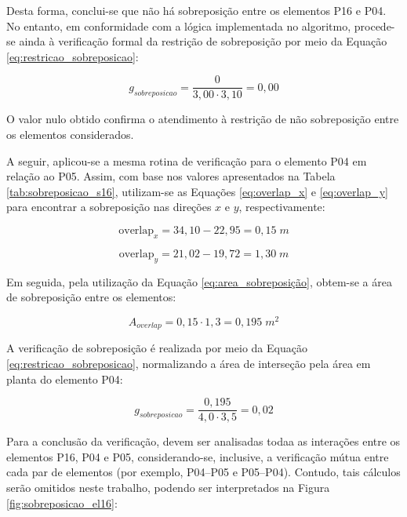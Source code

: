 Desta forma, conclui-se que não há sobreposição entre os elementos P16 e P04. No entanto, em conformidade com a lógica implementada no algoritmo, procede-se ainda à verificação formal da restrição de sobreposição por meio da Equação \eqref{eq:restricao_sobreposicao}:

\begin{equation}
g_{sobreposicao} = \frac{0}{3,00 \cdot 3,10} = 0,00
    \label{eq:EL16_restricao_sobreposicao}
\end{equation}

O valor nulo obtido confirma o atendimento à restrição de não sobreposição entre os elementos considerados.

A seguir, aplicou-se a mesma rotina de verificação para o elemento P04 em relação ao P05. Assim, com base nos valores apresentados na Tabela \ref{tab:sobreposicao_s16}, utilizam-se as Equações \eqref{eq:overlap_x} e \eqref{eq:overlap_y} para encontrar a sobreposição nas direções $x$ e $y$, respectivamente:

\begin{equation}
\text{overlap}_x =  34,10 - 22,95 = 0,15 \; m
\label{eq:EL04_overlp_x}
\end{equation}

\begin{equation}
\text{overlap}_y = 21,02 - 19,72 = 1,30 \; m
\label{eq:EL04_overlap_y}
\end{equation}


Em seguida, pela utilização da Equação \eqref{eq:area_sobreposição}, obtem-se a área de sobreposição entre os elementos:

\begin{equation}
    A_{overlap} = 0,15 \cdot 1,3 = 0,195 \; m^2
    \label{eq:EL04_area_sobreposição}
\end{equation}

A verificação de sobreposição é realizada por meio da Equação \eqref{eq:restricao_sobreposicao}, normalizando a área de interseção pela área em planta do elemento P04:

\begin{equation}
g_{sobreposicao} = \frac{0,195}{4,0 \cdot 3,5} = 0,02 
    \label{eq:EL16_restricao_sobreposicao}
\end{equation}

Para a conclusão da verificação, devem ser analisadas todaa as interações entre os elementos P16, P04 e P05, considerando-se, inclusive, a verificação mútua entre cada par de elementos (por exemplo, P04–P05 e P05–P04). Contudo, tais cálculos serão omitidos neste trabalho, podendo ser interpretados na Figura \ref{fig:sobreposicao_el16}:


